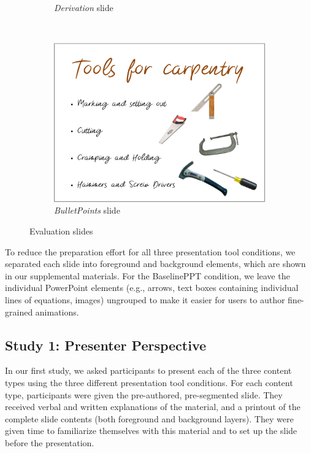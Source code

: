 \begin{figure}[h!]
\begin{subfigure}[t]{0.48\columnwidth}
        \captionsetup{font=footnotesize}\caption{\textit{Derivation} slide}
    \end{subfigure}  
    ~
    \begin{subfigure}[t]{0.48\columnwidth}
        \centering
        \includegraphics[width=1\columnwidth]{figures/tools}
        \captionsetup{font=footnotesize}\caption{\textit{BulletPoints} slide}
    \end{subfigure}  
    \caption{Evaluation slides}
    \label{fig:studyslides}
\end{figure}

To reduce the preparation effort for all three presentation tool conditions, we separated each slide into foreground and background elements, which are shown in our supplemental materials. For the BaselinePPT condition, we leave the individual PowerPoint elements (e.g., arrows, text boxes containing individual lines of equations, images) ungrouped to make it easier for users to author fine-grained animations. 

\subsection{Study 1: Presenter Perspective}
In our first study, we asked participants to present each of the three content types using the three different presentation tool conditions. 
%
For each content type, participants were given the pre-authored, pre-segmented slide. 
They received verbal and written explanations of the material, and a printout of the complete slide contents (both foreground and background layers). They were given time to familiarize themselves with this material and to set up the slide before the presentation.\\

